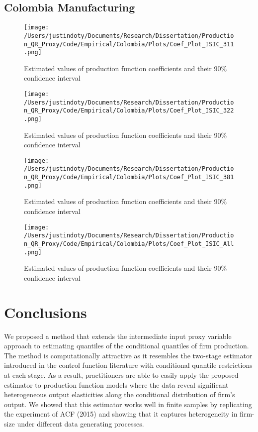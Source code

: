 \documentclass[11pt]{article}
\begin{document}
\subsection{Colombia Manufacturing}




\begin{figure}[H]
\centering
\caption{Estimated values of production function coefficients and their 90\% confidence interval}
\texttt{[image: /Users/justindoty/Documents/Research/Dissertation/Production\_QR\_Proxy/Code/Empirical/Colombia/Plots/Coef\_Plot\_ISIC\_311.png]}
\end{figure}

\begin{figure}[H]
\centering
\caption{Estimated values of production function coefficients and their 90\% confidence interval}
\texttt{[image: /Users/justindoty/Documents/Research/Dissertation/Production\_QR\_Proxy/Code/Empirical/Colombia/Plots/Coef\_Plot\_ISIC\_322.png]}
\end{figure}

\begin{figure}[H]
\centering
\caption{Estimated values of production function coefficients and their 90\% confidence interval}
\texttt{[image: /Users/justindoty/Documents/Research/Dissertation/Production\_QR\_Proxy/Code/Empirical/Colombia/Plots/Coef\_Plot\_ISIC\_381.png]}
\end{figure}

\begin{figure}[H]
\centering
\caption{Estimated values of production function coefficients and their 90\% confidence interval}
\texttt{[image: /Users/justindoty/Documents/Research/Dissertation/Production\_QR\_Proxy/Code/Empirical/Colombia/Plots/Coef\_Plot\_ISIC\_All.png]}
\end{figure}

\section{Conclusions}

We proposed a method that extends the intermediate input proxy variable approach to estimating quantiles of the conditional quantiles of firm production. The method is computationally attractive as it resembles the two-stage estimator introduced in the control function literature with conditional quantile restrictions at each stage. As a result, practitioners are able to easily apply the proposed estimator to production function models where the data reveal significant heterogeneous output elasticities along the conditional distribution of firm's output. We showed that this estimator works well in finite samples by replicating the experiment of ACF (2015) and showing that it captures heterogeneity in firm-size under different data generating processes.  
\end{document}
